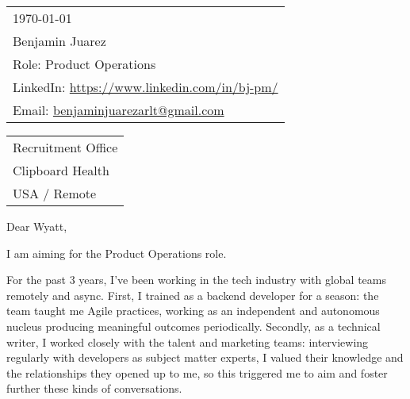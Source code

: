 \hfill%
\begin{tabular}{l @{}}
	\today \bigskip\\ %
	Benjamin Juarez \smallskip \\
	Role: %
Product Operations \\
	LinkedIn: \href{https://www.linkedin.com/in/bj-pm/?locale=en_US}{https://www.linkedin.com/in/bj-pm/} \\
	Email: \href{benjaminjuarezarlt@gmail.com}{benjaminjuarezarlt@gmail.com} \\
\end{tabular}

\bigskip %


\begin{tabular}{@{} l}
    Recruitment Office \\ %
    Clipboard Health
    \\ 
    USA / Remote
\end{tabular}

\bigskip %


Dear Wyatt, %
\bigskip %


I am aiming for the Product Operations role.

For the past 3 years, I've been working in the tech industry with global teams remotely and async. 
First, I trained as a backend developer for a season: 
the team taught me Agile practices, working as an independent and autonomous nucleus
producing meaningful outcomes periodically.
Secondly, as a technical writer, I worked closely with the talent and marketing teams:
interviewing regularly with developers as subject matter experts,
I valued their knowledge and the relationships they opened up to me,
so this triggered me to aim and foster further these kinds of conversations.

